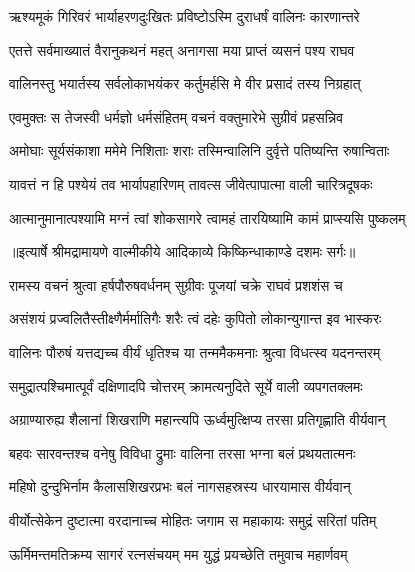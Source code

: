 \twolineshloka
{ऋश्यमूकं गिरिवरं भार्याहरणदुःखितः}
{प्रविष्टोऽस्मि दुराधर्षं वालिनः कारणान्तरे} %

\twolineshloka
{एतत्ते सर्वमाख्यातं वैरानुकथनं महत्}
{अनागसा मया प्राप्तं व्यसनं पश्य राघव} %

\twolineshloka
{वालिनस्तु भयार्तस्य सर्वलोकाभयंकर}
{कर्तुमर्हसि मे वीर प्रसादं तस्य निग्रहात्} %

\twolineshloka
{एवमुक्तः स तेजस्वी धर्मज्ञो धर्मसंहितम्}
{वचनं वक्तुमारेभे सुग्रीवं प्रहसन्निव} %

\twolineshloka
{अमोघाः सूर्यसंकाशा ममेमे निशिताः शराः}
{तस्मिन्वालिनि दुर्वृत्ते पतिष्यन्ति रुषान्विताः} %

\twolineshloka
{यावत्तं न हि पश्येयं तव भार्यापहारिणम्}
{तावत्स जीवेत्पापात्मा वाली चारित्रदूषकः} %

\twolineshloka
{आत्मानुमानात्पश्यामि मग्नं त्वां शोकसागरे}
{त्वामहं तारयिष्यामि कामं प्राप्स्यसि पुष्कलम्} %


{॥इत्यार्षे श्रीमद्रामायणे वाल्मीकीये आदिकाव्ये किष्किन्धाकाण्डे दशमः सर्गः॥}


\twolineshloka
{रामस्य वचनं श्रुत्वा हर्षपौरुषवर्धनम्}
{सुग्रीवः पूजयां चक्रे राघवं प्रशशंस च} %

\twolineshloka
{असंशयं प्रज्वलितैस्तीक्ष्णैर्मर्मातिगैः शरैः}
{त्वं दहेः कुपितो लोकान्युगान्त इव भास्करः} %

\twolineshloka
{वालिनः पौरुषं यत्तद्यच्च वीर्यं धृतिश्च या}
{तन्ममैकमनाः श्रुत्वा विधत्स्व यदनन्तरम्} %

\twolineshloka
{समुद्रात्पश्चिमात्पूर्वं दक्षिणादपि चोत्तरम्}
{क्रामत्यनुदिते सूर्ये वाली व्यपगतक्लमः} %

\twolineshloka
{अग्राण्यारुह्य शैलानां शिखराणि महान्त्यपि}
{ऊर्ध्वमुत्क्षिप्य तरसा प्रतिगृह्णाति वीर्यवान्} %

\twolineshloka
{बहवः सारवन्तश्च वनेषु विविधा द्रुमाः}
{वालिना तरसा भग्ना बलं प्रथयतात्मनः} %

\twolineshloka
{महिषो दुन्दुभिर्नाम कैलासशिखरप्रभः}
{बलं नागसहस्रस्य धारयामास वीर्यवान्} %

\twolineshloka
{वीर्योत्सेकेन दुष्टात्मा वरदानाच्च मोहितः}
{जगाम स महाकायः समुद्रं सरितां पतिम्} %

\twolineshloka
{ऊर्मिमन्तमतिक्रम्य सागरं रत्नसंचयम्}
{मम युद्धं प्रयच्छेति तमुवाच महार्णवम्} %

